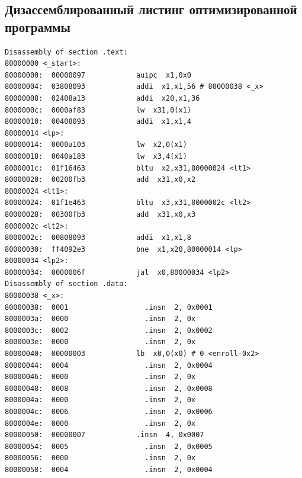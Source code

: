 \documentclass{article}
\begin{document}
\clearpage\subsection{Дизассемблированный листинг оптимизированной программы}
\begin{lstlisting}[style=lst, caption=Дизассемблированный листинг оптимизированной программы]
Disassembly of section .text:
80000000 <_start>:
80000000:  00000097            auipc  x1,0x0
80000004:  03808093            addi  x1,x1,56 # 80000038 <_x>
80000008:  02408a13            addi  x20,x1,36
8000000c:  0000af83            lw  x31,0(x1)
80000010:  00408093            addi  x1,x1,4
80000014 <lp>:
80000014:  0000a103            lw  x2,0(x1)
80000018:  0040a183            lw  x3,4(x1)
8000001c:  01f16463            bltu  x2,x31,80000024 <lt1>
80000020:  00200fb3            add  x31,x0,x2
80000024 <lt1>:
80000024:  01f1e463            bltu  x3,x31,8000002c <lt2>
80000028:  00300fb3            add  x31,x0,x3
8000002c <lt2>:
8000002c:  00808093            addi  x1,x1,8
80000030:  ff4092e3            bne  x1,x20,80000014 <lp>
80000034 <lp2>:
80000034:  0000006f            jal  x0,80000034 <lp2>
Disassembly of section .data:
80000038 <_x>:
80000038:  0001                  .insn  2, 0x0001
8000003a:  0000                  .insn  2, 0x
8000003c:  0002                  .insn  2, 0x0002
8000003e:  0000                  .insn  2, 0x
80000040:  00000003            lb  x0,0(x0) # 0 <enroll-0x2>
80000044:  0004                  .insn  2, 0x0004
80000046:  0000                  .insn  2, 0x
80000048:  0008                  .insn  2, 0x0008
8000004a:  0000                  .insn  2, 0x
8000004c:  0006                  .insn  2, 0x0006
8000004e:  0000                  .insn  2, 0x
80000050:  00000007            .insn  4, 0x0007
80000054:  0005                  .insn  2, 0x0005
80000056:  0000                  .insn  2, 0x
80000058:  0004                  .insn  2, 0x0004
\end{lstlisting}
\end{document}
